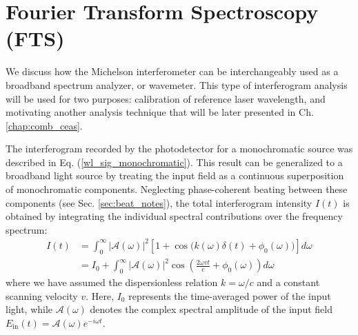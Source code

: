 \documentclass[12pt]{report}
\begin{document}
	
	\section{Fourier Transform Spectroscopy (FTS)} \label{sec:wl_FTIR}

	We discuss how the Michelson interferometer can be interchangeably used as a broadband spectrum analyzer, or wavemeter. This type of interferogram analysis will be used for two purposes: calibration of reference laser wavelength, and motivating another analysis technique that will be later presented in Ch. \ref{chap:comb_ceas}.
	
	The interferogram recorded by the photodetector for a monochromatic source was described in Eq. (\ref{wl_sig_monochromatic}). This result can be generalized to a broadband light source by treating the input field as a continuous superposition of monochromatic components. Neglecting phase-coherent beating between these components (see Sec. \ref{sec:beat_notes}), the total interferogram intensity $I(t)$ is obtained by integrating the individual spectral contributions over the frequency spectrum:
	\begin{align} \label{wl_interferogram_incoherent}
		I(t) &= \int_{0}^{\infty} |\mathcal{A}(\omega)|^2 \left[ 1 + \cos\big(k(\omega)\delta(t) + \phi_0(\omega)\big) \right] d\omega \nonumber \\
		&= I_0 + \int_{0}^{\infty} |\mathcal{A}(\omega)|^2 \cos\left(\frac{2\omega vt}{c} + \phi_0(\omega)\right) d\omega
	\end{align}
	where we have assumed the dispersionless relation $k = \omega/c$ and a constant scanning velocity $v$. Here, $I_0$ represents the time-averaged power of the input light, while $\mathcal{A}(\omega)$ denotes the complex spectral amplitude of the input field $E_\mathrm{in}(t) = \mathcal{A}(\omega) e^{-i\omega t}$.
	
\end{document}
